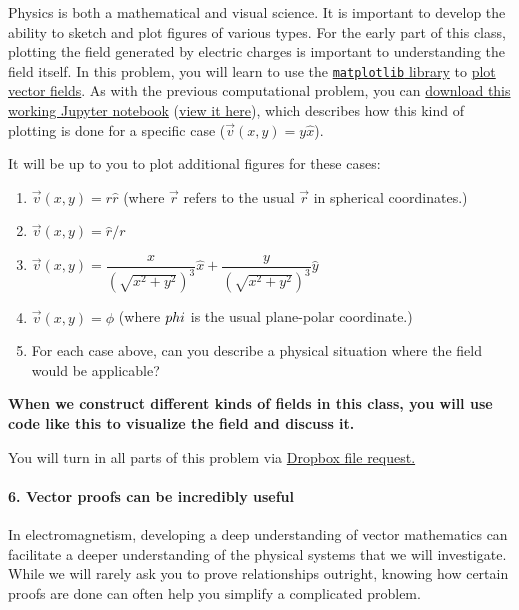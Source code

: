\documentclass[
  letterpaperpaper,
]{article}
\providecommand{\tightlist}{%
  \setlength{\itemsep}{0pt}\setlength{\parskip}{0pt}}
\begin{document}
Physics is both a mathematical and visual science. It is important to
develop the ability to sketch and plot figures of various types. For the
early part of this class, plotting the field generated by electric
charges is important to understanding the field itself. In this problem,
you will learn to use the
\href{http://matplotlib.org}{\texttt{matplotlib} library} to
\href{http://matplotlib.org/examples/pylab_examples/quiver_demo.html}{plot
vector fields}. As with the previous computational problem, you can
\href{../jupyter/HW1-VectorFieldsProblem.ipynb}{download this working
Jupyter notebook}
(\href{https://github.com/dannycab/phy481msu_f2019/blob/master/jupyter/HW1-VectorFieldsProblem.ipynb}{view
it here}), which describes how this kind of plotting is done for a
specific case (\(\vec{v}(x,y)=y\hat{x}\)).

It will be up to you to plot additional figures for these cases:

\begin{enumerate}
\def\labelenumi{\arabic{enumi}.}
\tightlist
\item
  \(\vec{v}(x,y)=r\hat{r}\) (where \(\vec{r}\) refers to the usual
  \(\vec{r}\) in spherical coordinates.)
\item
  \(\vec{v}(x,y)=\hat{r}/r\)
\item
  \(\vec{v}(x,y) = \dfrac{x}{(\sqrt{x^2+y^2})^3}\hat{x}+\dfrac{y}{(\sqrt{x^2+y^2})^3}\hat{y}\)
\item
  \(\vec{v}(x,y) = \hat{\phi}\) (where \(\\phi\) is the usual
  plane-polar coordinate.)
\item
  For each case above, can you describe a physical situation where the
  field would be applicable?
\end{enumerate}

\textbf{When we construct different kinds of fields in this class, you
will use code like this to visualize the field and discuss it.}

You will turn in all parts of this problem via
\href{https://www.dropbox.com/request/TWSUUsUgJ7zKmQeAuDzB}{Dropbox file
request.}

\hypertarget{vector-proofs-can-be-incredibly-useful}{%
\paragraph{6. Vector proofs can be incredibly
useful}\label{vector-proofs-can-be-incredibly-useful}}

In electromagnetism, developing a deep understanding of vector
mathematics can facilitate a deeper understanding of the physical
systems that we will investigate. While we will rarely ask you to prove
relationships outright, knowing how certain proofs are done can often
help you simplify a complicated problem.
\end{document}
